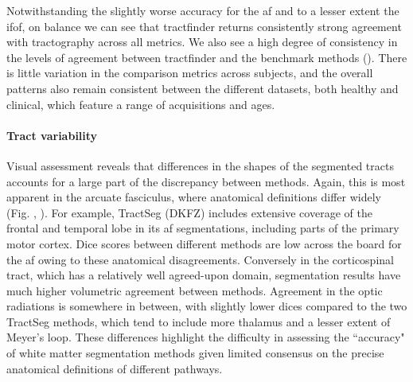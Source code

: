 Notwithstanding the slightly worse accuracy for the \gls{af} and to a lesser extent the \gls{ifof}, on balance we can see that tractfinder returns consistently strong agreement with tractography across all metrics.
We also see a high degree of consistency in the levels of agreement between tractfinder and the benchmark methods ().
There is little variation in the comparison metrics across subjects, and the overall patterns also remain consistent between the different datasets, both healthy and clinical, which feature a range of acquisitions and ages.

\paragraph*{Tract variability}

Visual assessment reveals that  differences in the shapes of the segmented tracts accounts for a large part of the discrepancy between methods.
Again, this is most apparent in the arcuate fasciculus, where anatomical definitions differ widely (Fig. , ).
For example, TractSeg (DKFZ) includes extensive coverage of the frontal and temporal lobe in its \gls{af} segmentations, including parts of the primary motor cortex.
Dice scores between different methods are low across the board for the \gls{af} owing to these anatomical disagreements.
Conversely in the corticospinal tract, which has a relatively well agreed-upon domain, segmentation results have much higher volumetric agreement between methods. 
Agreement in the optic radiations is somewhere in between, with slightly lower \glspl{dice} compared to the two TractSeg methods, which tend to include more thalamus and a lesser extent of Meyer's loop.
These differences highlight the difficulty in assessing the ``accuracy" of white matter segmentation methods given limited consensus on the precise anatomical definitions of different pathways.


